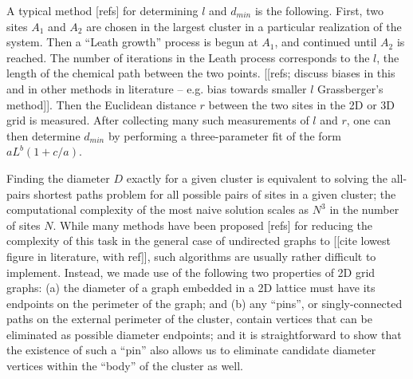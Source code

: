 \documentclass[aps, preprint, groupedaddress]{revtex4-1}
\begin{document}


A typical method [refs] for determining $l$ and $d_{min}$ is the following.  First, two sites $A_1$ and $A_2$ are chosen in the largest cluster in a particular realization of the system.  Then a ``Leath growth'' process is begun at $A_1$, and continued until $A_2$ is reached.  The number of iterations in the Leath process corresponds to the $l$, the length of the chemical path between the two points.  [[refs; discuss biases in this and in other methods in literature -- e.g. bias towards smaller $l$ Grassberger's method]]. Then the Euclidean distance $r$ between the two sites in the 2D or 3D grid is measured.  After collecting many such measurements of $l$ and $r$, one can then determine $d_{min}$ by performing a three-parameter fit of the form $a L ^ b (1+ c/a)$.  


Finding the diameter $D$ exactly for a given cluster is equivalent to solving the all-pairs shortest paths problem for all possible pairs of sites in a given cluster;  the computational complexity of the most naive solution scales as $N^3$ in the number of sites $N$.  While many methods have been proposed [refs] for reducing the complexity of this task in the general case of undirected graphs to [[cite lowest figure in literature, with ref]], such algorithms are usually rather difficult to implement.  Instead, we made use of the following two properties of 2D grid graphs:  (a) the diameter of a graph embedded in a 2D lattice must have its endpoints on the perimeter of the graph; and (b) any ``pins'', or singly-connected paths on the external perimeter of the cluster, contain vertices that can be eliminated as possible diameter endpoints; and it is straightforward to show that the existence of such a ``pin'' also allows us to eliminate candidate diameter vertices within the ``body'' of the cluster as well.  
\end{document}
